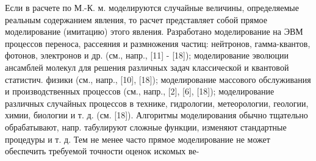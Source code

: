 \documentclass[10pt]{article}
\begin{document}
Если в расчете по М.-К. м. моделируются случайные величины, определяемые реальным содержанием явления, то расчет представляет собой прямое моделирование (имитацию) этого явления. Разработано моделирование на ЭВМ процессов переноса, рассеяния и размножения частиц: нейтронов, гамма-квантов, фотонов, электронов и др. (см., напр., [11] - [18]); моделирование эволюции ансамблей молекул для решения различных задач классической и квантовой статистич. физики (см., напр., [10], [18]); моделирование массового обслуживания и производственных процессов (см., напр., [2], [6], [18]); моделирование различных случайных процессов в технике, гидрологии, метеорологии, геологии, химии, биологии и т. д. (см. [18]). Алгоритмы моделирования обычно тщательно обрабатывают, напр. табулируют сложные функции, изменяют стандартные процедуры и т. д. Тем не менее часто прямое моделирование не может обеспечить требуемой точности оценок искомых ве-
\end{document}
